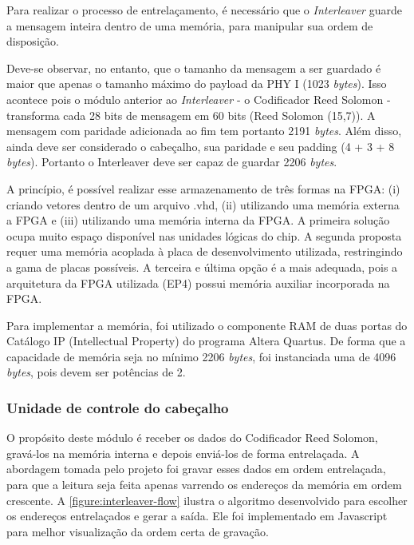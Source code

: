 	Para realizar o processo de entrelaçamento, é necessário que o \textit{Interleaver} guarde a mensagem inteira dentro de uma memória, para manipular sua ordem de disposição. 
	
	Deve-se observar, no entanto, que o tamanho da mensagem a ser guardado é maior que apenas o tamanho máximo do payload da PHY I (1023 \textit{bytes}). Isso acontece pois o módulo anterior ao \textit{Interleaver} - o Codificador Reed Solomon - transforma cada 28 bits de mensagem em 60 bits (Reed Solomon (15,7)). A mensagem com paridade adicionada ao fim tem portanto 2191 \textit{bytes}. Além disso, ainda deve ser considerado o cabeçalho, sua paridade e seu padding (4 + 3 + 8 \textit{bytes}). Portanto o Interleaver deve ser capaz de guardar 2206 \textit{bytes}.
	
	A princípio, é possível realizar esse armazenamento de três formas na FPGA: (i) criando vetores dentro de um arquivo .vhd, (ii) utilizando uma memória externa a FPGA e (iii) utilizando uma memória interna da FPGA. A primeira solução ocupa muito espaço disponível nas unidades lógicas do chip. A segunda proposta requer uma memória acoplada à placa de desenvolvimento utilizada, restringindo a gama de placas possíveis. A terceira e última opção é a mais adequada, pois a arquitetura da FPGA utilizada (EP4) possui memória auxiliar incorporada na FPGA.
	
	Para implementar a memória, foi utilizado o componente RAM de duas portas do Catálogo IP (Intellectual Property) do programa Altera Quartus. De forma que a capacidade de memória seja no mínimo 2206 \textit{bytes}, foi instanciada uma de 4096 \textit{bytes}, pois devem ser potências de 2.

	\subsubsection{Unidade de controle do cabeçalho}\label{section:interleaver-header-control}
	
	O propósito deste módulo é receber os dados do Codificador Reed Solomon, gravá-los na memória interna e depois enviá-los de forma entrelaçada. A abordagem tomada pelo projeto foi gravar esses dados em ordem entrelaçada, para que a leitura seja feita apenas varrendo os endereços da memória em ordem crescente. A \autoref{figure:interleaver-flow} ilustra o algoritmo desenvolvido para escolher os endereços entrelaçados e gerar a saída. Ele foi implementado em Javascript para melhor visualização da ordem certa de gravação.

